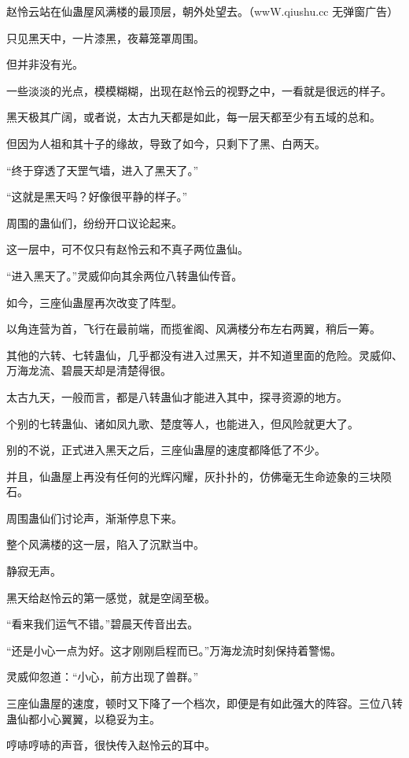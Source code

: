 
\begin{this_body}

赵怜云站在仙蛊屋风满楼的最顶层，朝外处望去。（wwW.qiushu.cc 无弹窗广告）

只见黑天中，一片漆黑，夜幕笼罩周围。

但并非没有光。

一些淡淡的光点，模模糊糊，出现在赵怜云的视野之中，一看就是很远的样子。

黑天极其广阔，或者说，太古九天都是如此，每一层天都至少有五域的总和。

但因为人祖和其十子的缘故，导致了如今，只剩下了黑、白两天。

“终于穿透了天罡气墙，进入了黑天了。”

“这就是黑天吗？好像很平静的样子。”

周围的蛊仙们，纷纷开口议论起来。

这一层中，可不仅只有赵怜云和不真子两位蛊仙。

“进入黑天了。”灵威仰向其余两位八转蛊仙传音。

如今，三座仙蛊屋再次改变了阵型。

以角连营为首，飞行在最前端，而揽雀阁、风满楼分布左右两翼，稍后一筹。

其他的六转、七转蛊仙，几乎都没有进入过黑天，并不知道里面的危险。灵威仰、万海龙流、碧晨天却是清楚得很。

太古九天，一般而言，都是八转蛊仙才能进入其中，探寻资源的地方。

个别的七转蛊仙、诸如凤九歌、楚度等人，也能进入，但风险就更大了。

别的不说，正式进入黑天之后，三座仙蛊屋的速度都降低了不少。

并且，仙蛊屋上再没有任何的光辉闪耀，灰扑扑的，仿佛毫无生命迹象的三块陨石。

周围蛊仙们讨论声，渐渐停息下来。

整个风满楼的这一层，陷入了沉默当中。

静寂无声。

黑天给赵怜云的第一感觉，就是空阔至极。

“看来我们运气不错。”碧晨天传音出去。

“还是小心一点为好。这才刚刚启程而已。”万海龙流时刻保持着警惕。

灵威仰忽道：“小心，前方出现了兽群。”

三座仙蛊屋的速度，顿时又下降了一个档次，即便是有如此强大的阵容。三位八转蛊仙都小心翼翼，以稳妥为主。

哼哧哼哧的声音，很快传入赵怜云的耳中。


\end{this_body}
